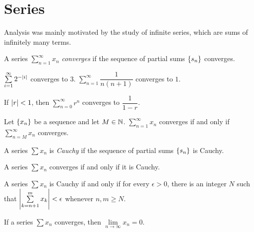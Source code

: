 \documentclass{article}
\begin{document}
\section{Series}

Analysis was mainly motivated by the study of infinite series, which are sums of infinitely many terms.

\begin{definition}
  A series $\sum_{n=1}^\infty x_n$ \emph{converges} if the sequence of partial sums $\{s_n\}$ converges.
\end{definition}

\begin{example}
  $\sum\limits_{i = 1}^\infty 2^{-\abs{i}}$ converges to $3$.
  $\sum\limits_{n = 1}^\infty \dfrac{1}{n(n + 1)}$ converges to $1$.
\end{example}

\begin{theorem}
  If $\abs{r} < 1$, then $\sum\limits_{n = 0}^\infty r^n$ converges to $\dfrac{1}{1 - r}$.
\end{theorem}

\begin{theorem}
  Let $\{x_n\}$ be a sequence and let $M \in \mathbb{N}$.
  $\sum\limits_{n = 1}^\infty x_n$ converges if and only if $\sum\limits_{n = M}^\infty x_n$ converges.
\end{theorem}

\begin{definition}
  A series $\sum x_n$ is \emph{Cauchy} if the sequence of partial sums $\{s_n\}$ is Cauchy.
\end{definition}

\begin{theorem}
  A series $\sum x_n$ converges if and only if it is Cauchy.
\end{theorem}

\begin{theorem}
  A series $\sum x_n$ is Cauchy if and only if for every $\epsilon > 0$, there is an integer $N$ such that $\abs{\sum\limits_{k = n + 1}^m x_k} < \epsilon$ whenever $n, m \geq N$.
\end{theorem}

\begin{theorem}
  If a series $\sum x_n$ converges, then $\lim\limits_{n \to \infty} x_n = 0$.
\end{theorem}
\end{document}

